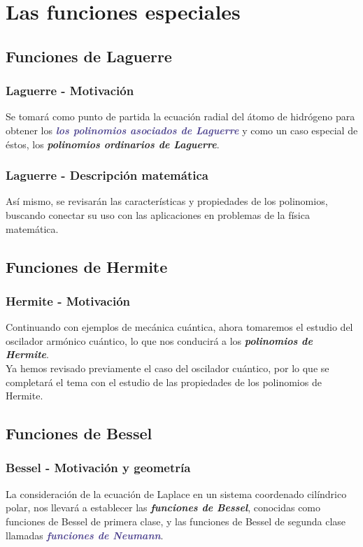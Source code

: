 \documentclass[12pt]{beamer}
\begin{document}
\section{Las funciones especiales}

\subsection{Funciones de Laguerre}

\begin{frame}
\frametitle{Laguerre - Motivación}
Se tomará como punto de partida la ecuación radial del átomo de hidrógeno para obtener los \emph{\textbf{\textcolor{darkslateblue}{los polinomios asociados de Laguerre}}} \pause y como un caso especial de éstos, los \emph{\textbf{\textcolor{darktan}{polinomios ordinarios de Laguerre}}}.
\end{frame}
\begin{frame}
\frametitle{Laguerre - Descripción matemática}
Así mismo, se revisarán las características y propiedades de los polinomios, buscando conectar su uso con las aplicaciones en problemas de la física matemática.
\end{frame}

\subsection{Funciones de Hermite}

\begin{frame}
\frametitle{Hermite - Motivación}
Continuando con ejemplos de mecánica cuántica, ahora tomaremos el estudio del oscilador armónico cuántico, lo que nos conducirá a los \emph{\textbf{\textcolor{darkterracotta}{polinomios de Hermite}}}.
\\
\bigskip
\pause
Ya hemos revisado previamente el caso del oscilador cuántico, por lo que se completará el tema con el estudio de las propiedades de los polinomios de Hermite.
\end{frame}

\subsection{Funciones de Bessel}

\begin{frame}
\frametitle{Bessel - Motivación y geometría}
La consideración de la ecuación de Laplace en un sistema coordenado cilíndrico polar, nos llevará a establecer las \emph{\textbf{\textcolor{debianred}{funciones de Bessel}}}, conocidas como funciones de Bessel de primera clase, \pause y las funciones de Bessel de segunda clase llamadas \emph{\textbf{\textcolor{darkslateblue}{funciones de Neumann}}}.
\end{frame}
\end{document}
